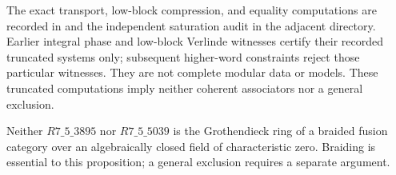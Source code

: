 The exact transport, low-block compression, and equality computations
are recorded in  and
the independent saturation audit in the adjacent 
directory.  Earlier integral phase and low-block Verlinde witnesses
certify their recorded truncated systems only; subsequent higher-word
constraints reject those particular witnesses.  They are not complete
modular data or models. These truncated computations imply neither
coherent associators nor a general exclusion.

\begin{proposition}
\label{prop:m5-frontier-no-braiding}
Neither $R7\_5\_3895$ nor $R7\_5\_5039$ is the Grothendieck ring of
a braided fusion category over an algebraically closed field of
characteristic zero. Braiding is essential to this proposition; a general
exclusion requires a separate argument.
\end{proposition}
